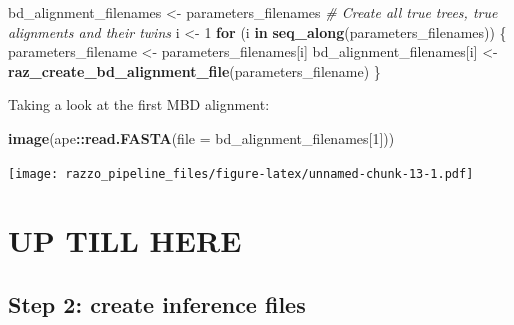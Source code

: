 \documentclass[]{article}
\newenvironment{Shaded}{\begin{snugshade}}{\end{snugshade}}
\newcommand{\KeywordTok}[1]{\textcolor[rgb]{0.13,0.29,0.53}{\textbf{#1}}}
\newcommand{\DataTypeTok}[1]{\textcolor[rgb]{0.13,0.29,0.53}{#1}}
\newcommand{\DecValTok}[1]{\textcolor[rgb]{0.00,0.00,0.81}{#1}}
\newcommand{\StringTok}[1]{\textcolor[rgb]{0.31,0.60,0.02}{#1}}
\newcommand{\CommentTok}[1]{\textcolor[rgb]{0.56,0.35,0.01}{\textit{#1}}}
\newcommand{\ControlFlowTok}[1]{\textcolor[rgb]{0.13,0.29,0.53}{\textbf{#1}}}
\newcommand{\OperatorTok}[1]{\textcolor[rgb]{0.81,0.36,0.00}{\textbf{#1}}}
\newcommand{\NormalTok}[1]{#1}
\begin{document}
\begin{Shaded}
\begin{Highlighting}[]
\NormalTok{bd_alignment_filenames <-}\StringTok{ }\NormalTok{parameters_filenames}
\CommentTok{# Create all true trees, true alignments and their twins}
\NormalTok{i <-}\StringTok{ }\DecValTok{1}
\ControlFlowTok{for}\NormalTok{ (i }\ControlFlowTok{in} \KeywordTok{seq_along}\NormalTok{(parameters_filenames)) \{}
\NormalTok{  parameters_filename <-}\StringTok{ }\NormalTok{parameters_filenames[i]}
\NormalTok{  bd_alignment_filenames[i] <-}\StringTok{ }\KeywordTok{raz_create_bd_alignment_file}\NormalTok{(parameters_filename)}
\NormalTok{\}}
\end{Highlighting}
\end{Shaded}

Taking a look at the first MBD alignment:

\begin{Shaded}
\begin{Highlighting}[]
\KeywordTok{image}\NormalTok{(ape}\OperatorTok{::}\KeywordTok{read.FASTA}\NormalTok{(}\DataTypeTok{file =}\NormalTok{ bd_alignment_filenames[}\DecValTok{1}\NormalTok{]))}
\end{Highlighting}
\end{Shaded}

\texttt{[image: razzo\_pipeline\_files/figure-latex/unnamed-chunk-13-1.pdf]}

\section{UP TILL HERE}\label{up-till-here}

\subsection{Step 2: create inference
files}\label{step-2-create-inference-files}
\end{document}
